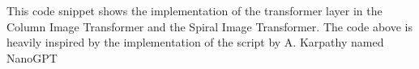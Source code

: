 This code snippet shows the implementation of the transformer layer in the Column Image Transformer and the Spiral Image Transformer. The code above is heavily inspired by the implementation of the script by A.
Karpathy named NanoGPT \autocite{nanoGPTkarpathy2023} \autocite{nanogpt-lecturekarpathy2023}
